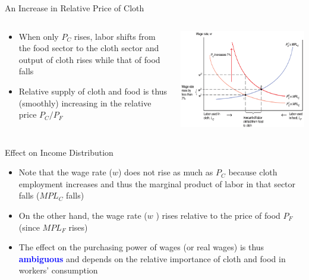 \documentclass[10pt,hyperref={CJKbookmarks=true},xcolor=dvipsnames,aspectratio=169]{beamer}
\begin{document}
\begin{frame}{An Increase in Relative Price of Cloth }


\begin{columns}[onlytextwidth]
\begin{column}{0.4\textwidth}
\begin{itemize}
\item When only $P_{C}$ rises, labor shifts from the food sector to the
cloth sector and output of cloth rises while that of food falls 
\item Relative supply of cloth and food is thus (smoothly) increasing in
the relative price $P_{C}/P_{F}$
\end{itemize}

\end{column}
\begin{column}{0.6\textwidth}
\centering \includegraphics[width=0.9\columnwidth]{fig/sfm/lec4-18}
\end{column}
\end{columns}

\end{frame}

\begin{frame}{Effect on Income Distribution }

\begin{itemize}
\item Note that the wage rate ($w$) does not rise as much as $P_{C}$ because
cloth employment increases and thus the marginal product of labor
in that sector falls ($MPL_{C}$ falls) 
\item On the other hand, the wage rate ($w$ ) rises relative to the price
of food $P_{F}$ (since $MPL_{F}$ rises) 
\item The effect on the purchasing power of wages (or real wages) is thus
\textbf{\textcolor{blue}{ambiguous}} and depends on the relative importance
of cloth and food in workers’ consumption
\end{itemize}
\end{frame}
\end{document}
